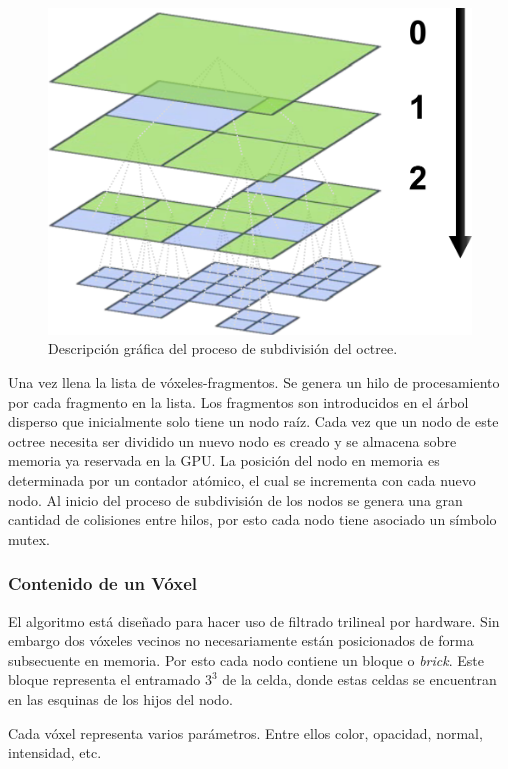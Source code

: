 \begin{figure}
	\includegraphics[width=0.95\linewidth]{media/miplevels.png}
	\caption{Descripción gráfica del proceso de subdivisión del octree.}
	\label{fig:miplevels}
\end{figure}

Una vez llena la lista de vóxeles-fragmentos. Se genera un hilo de procesamiento por cada fragmento en la lista. Los fragmentos son introducidos en el árbol disperso que inicialmente solo tiene un nodo raíz. Cada vez que un nodo de este octree necesita ser dividido un nuevo nodo es creado y se almacena sobre memoria ya reservada en la \ac{GPU}. La posición del nodo en memoria es determinada por un contador atómico, el cual se incrementa con cada nuevo nodo. Al inicio del proceso de subdivisión de los nodos se genera una gran cantidad de colisiones entre hilos, por esto cada nodo tiene asociado un símbolo mutex.

\subsubsection{Contenido de un Vóxel}
\label{subsub:voxelcontent_orig}

El algoritmo está diseñado para hacer uso de filtrado trilineal por hardware. Sin embargo dos vóxeles vecinos no necesariamente están posicionados de forma subsecuente en memoria. Por esto cada nodo contiene un bloque o \emph{brick}. Este bloque representa el entramado $3^3$ de la celda, donde estas celdas se encuentran en las esquinas de los hijos del nodo.

Cada vóxel representa varios parámetros. Entre ellos color, opacidad, normal, intensidad, etc.

